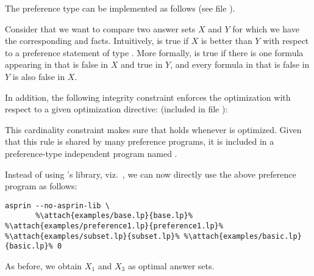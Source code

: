 \begin{example}\label{asprin:subset_imp}
The preference type  can be implemented as follows
(see file ).
%

%
Consider that we want to compare two answer sets $X$ and $Y$
for which we have the corresponding  and  facts. 
Intuitively,  is true if $X$ is better than $Y$ with respect to a preference statement  
of type . 
More formally, 
 is true if there is one formula  appearing in  that is false in $X$ and true in $Y$, 
and every formula  in  that is false in $Y$ is also false in $X$.  

In addition, 
the following integrity constraint enforces the optimization with respect to a given optimization directive:
(included in file ):
%

%
This cardinality constraint makes sure that  holds whenever  is optimized. 
Given that this rule is shared by many preference programs, 
it is included in a preference-type independent program named .

Instead of using \asprin's library, viz.~, 
we can now directly use the above preference program as follows:
\begin{lstlisting}[numbers=none,escapechar=\%]
asprin --no-asprin-lib \
       %\attach{examples/base.lp}{base.lp}% %\attach{examples/preference1.lp}{preference1.lp}% %\attach{examples/subset.lp}{subset.lp}% %\attach{examples/basic.lp}{basic.lp}% 0
\end{lstlisting}
As before, we obtain $X_1$ and $X_3$ as optimal answer sets.
\end{example}

